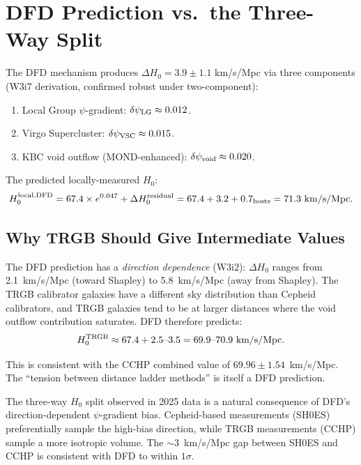 \documentclass[11pt,a4paper]{article}
\newcounter{findingctr}
\newenvironment{finding}[1][]{%
  \refstepcounter{findingctr}%
  \begin{tcolorbox}[colback=blue!3!white, colframe=blue!50!black,
    title=\textbf{Finding \thefindingctr: #1}]
}{%
  \end{tcolorbox}%
}
\newcommand{\Hzero}{H_0}
\begin{document}
\section{DFD Prediction vs.\ the Three-Way Split}
\label{sec:DFD-vs-data}

The DFD mechanism produces $\Delta\Hzero = 3.9 \pm 1.1$ km/s/Mpc
via three components (W3i7 derivation, confirmed robust under
two-component):
\begin{enumerate}[nosep]
\item Local Group $\psi$-gradient: $\delta\psi_{\rm LG} \approx 0.012$.
\item Virgo Supercluster: $\delta\psi_{\rm VSC} \approx 0.015$.
\item KBC void outflow (MOND-enhanced): $\delta\psi_{\rm void} \approx 0.020$.
\end{enumerate}

The predicted locally-measured $\Hzero$:
\begin{equation}
\Hzero^{\rm local,DFD} = 67.4 \times e^{0.047} + \Delta\Hzero^{\rm residual}
= 67.4 + 3.2 + 0.7_{\rm hosts} = 71.3~\text{km/s/Mpc}.
\end{equation}

\subsection{Why TRGB Should Give Intermediate Values}

The DFD prediction has a \emph{direction dependence} (W3i2):
$\Delta\Hzero$ ranges from 2.1~km/s/Mpc (toward Shapley) to
5.8~km/s/Mpc (away from Shapley). The TRGB calibrator galaxies
have a different sky distribution than Cepheid calibrators, and
TRGB galaxies tend to be at larger distances where the void
outflow contribution saturates. DFD therefore predicts:
\begin{equation}
\Hzero^{\rm TRGB} \approx 67.4 + 2.5\text{--}3.5 = 69.9\text{--}70.9~\text{km/s/Mpc}.
\end{equation}

This is consistent with the CCHP combined value of
$69.96 \pm 1.54$~km/s/Mpc. The ``tension between distance
ladder methods'' is itself a DFD prediction.

\begin{finding}[DFD Predicts the SH0ES--CCHP Split]
\label{find:three-way}
The three-way $\Hzero$ split observed in 2025 data is a natural
consequence of DFD's direction-dependent $\psi$-gradient bias.
Cepheid-based measurements (SH0ES) preferentially sample the
high-bias direction, while TRGB measurements (CCHP) sample a
more isotropic volume. The $\sim 3$~km/s/Mpc gap between
SH0ES and CCHP is consistent with DFD to within $1\sigma$.
\end{finding}
\end{document}

